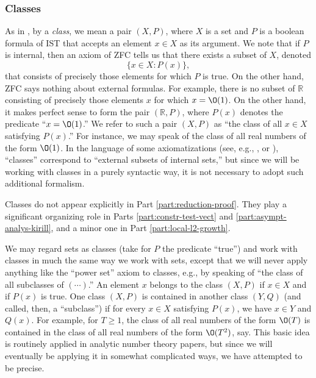 \subsubsection{Classes}\label{sec:classes}
As in \cite[\S3.1.4]{2020arXiv201202187N}, by a \emph{class}, we mean a pair $(X,P)$, where $X$ is a set and $P$ is a boolean formula of IST that accepts an element $x \in X$ as its argument.  We note that if $P$ is internal, then an axiom of ZFC tells us that there exists a subset of $X$, denoted
\begin{equation}\label{eq:cumotvxqcc}
  \{x \in X : P(x)\},
\end{equation}
that consists of precisely those elements for which $P$ is true.  On the other hand, ZFC says nothing about external formulas.  For example, there is no subset of $\mathbb{R}$ consisting of precisely those elements $x$ for which $x = \O(1)$.  On the other hand, it makes perfect sense to form the pair $(\mathbb{R},P)$, where $P(x)$ denotes the predicate ``$x = \O(1)$.''  We refer to such a pair $(X,P)$ as ``the class of all $x \in X$ satisfying $P(x)$.''  For instance, we may speak of the class of all real numbers of the form $\O(1)$.  In the language of some axiomatizations (see, e.g., \cite[\S3]{MR469763}, \cite{MR723332} or \cite[\S3]{MR546178}), ``classes'' correspond to ``external subsets of internal sets,'' but since we will be working with classes in a purely syntactic way, it is not necessary to adopt such additional formalism.

Classes do not appear explicitly in Part \ref{part:reduction-proof}.  They play a significant organizing role in Parts \ref{part:constr-test-vect} and \ref{part:asympt-analys-kirill}, and a minor one in Part \ref{part:local-l2-growth}.

We may regard sets as classes (take for $P$ the predicate ``true'') and work with classes in much the same way we work with sets, except that we will never apply anything like the ``power set'' axiom to classes, e.g., by speaking of ``the class of all subclasses of $(\dotsb)$.''  An element $x$ belongs to the class $(X,P)$ if $x \in X$ and if $P(x)$ is true.  One class $(X,P)$ is contained in another class $(Y,Q)$ (and called, then, a ``subclass'') if for every $x \in X$ satisfying $P(x)$, we have $x \in Y$ and $Q(x)$.  For example, for $T \geq 1$, the class of all real numbers of the form $\O(T)$ is contained in the class of all real numbers of the form $\O(T^2)$, say.  This basic idea is routinely applied in analytic number theory papers, but since we will eventually be applying it in somewhat complicated ways, we have attempted to be precise.

